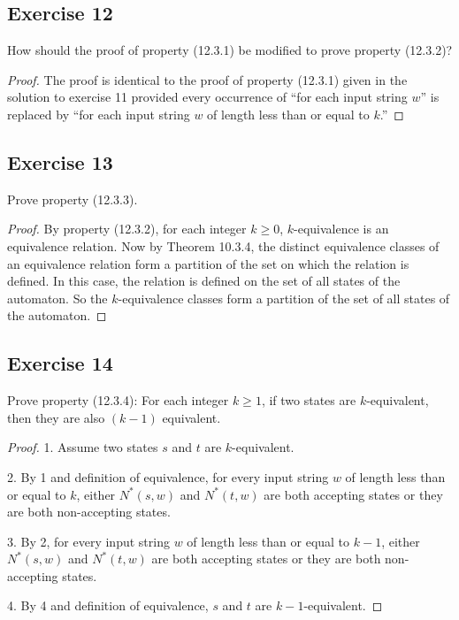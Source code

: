 \documentclass[14pt]{extarticle}
\begin{document}
\subsection{Exercise 12}
How should the proof of property (12.3.1) be modified to prove property (12.3.2)?

\begin{proof}
The proof is identical to the proof of property (12.3.1) given in the solution to exercise 11 provided every occurrence of 
“for each input string \(w\)” is replaced by “for each input string \(w\) of length less than or equal to \(k\).”
\end{proof}

\subsection{Exercise 13}
Prove property (12.3.3).
\begin{proof}
By property (12.3.2), for each integer \(k \geq 0\), \(k\)-equivalence is an equivalence relation. Now by Theorem 10.3.4, 
the distinct equivalence classes of an equivalence relation form a partition of the set on which the relation is defined. 
In this case, the relation is defined on the set of all states of the automaton. So the \(k\)-equivalence classes form a 
partition of the set of all states of the automaton.
\end{proof}

\subsection{Exercise 14}
Prove property (12.3.4): For each integer \(k \geq 1\), if two states are \(k\)-equivalent, then they are also \((k - 1)\) 
equivalent.

\begin{proof}
1. Assume two states \(s\) and \(t\) are \(k\)-equivalent.

2. By 1 and definition of equivalence, for every input string \(w\) of length less than or equal to \(k\), either 
\(N^*(s, w)\) and \(N^*(t, w)\) are both accepting states or they are both non-accepting states.

3. By 2, for every input string \(w\) of length less than or equal to \(k-1\), either \(N^*(s, w)\) and \(N^*(t, w)\) are 
both accepting states or they are both non-accepting states.

4. By 4 and definition of equivalence, \(s\) and \(t\) are \(k - 1\)-equivalent.
\end{proof}
\end{document}
